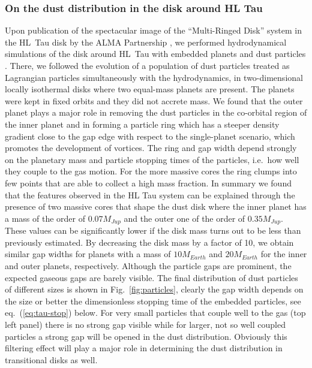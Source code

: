 \documentclass[10pt,fleqn,twoside]{article}
\begin{document}
\subsubsection{On the dust distribution in the disk around HL Tau}
%
Upon publication of the spectacular image of the ``Multi-Ringed Disk''
system in the HL~Tau disk by the ALMA Partnership
\citep{2015ApJ...808L...3A}, we
performed hydrodynamical simulations of the disk around HL~Tau with embedded planets and dust particles \citep{2015A&A...584A.110P}.
There, we followed the evolution of a population of dust particles treated as Lagrangian particles simultaneously with
the hydrodynamics, 
in two-dimensional locally isothermal disks where two equal-mass planets are present. 
The planets were kept in fixed orbits and they did not accrete mass. 
We found that the outer planet plays a major role in removing the dust particles in the co-orbital region of the 
inner planet and in forming a particle ring which has a steeper density gradient 
close to the gap edge with respect to the single-planet scenario, which promotes the development of vortices. 
The ring and gap width depend strongly on the planetary mass and particle stopping times of the particles,
i.e.\ how well they couple to the gas motion.
For the more massive cores the ring clumps into few points that are able to collect a high mass fraction.
In summary we found that the features observed in the HL Tau system can be explained
through the presence of two massive cores that shape the dust disk where the inner planet
has a mass of the order of $0.07 M_{Jup}$ and the outer one of the order of $0.35 M_{Jup}$. 
These values can be significantly lower if the disk mass turns out to be less than previously estimated. 
By decreasing the disk mass by a factor of 10, we obtain similar gap widths for planets with
a mass of $10 M_{Earth}$ and $20 M_{Earth}$ for the inner and outer planets, respectively. 
Although the particle gaps are prominent, the expected gaseous gaps are barely visible.
The final distribution of dust particles of different sizes is shown in Fig.~\ref{fig:particles},
clearly the gap width depends on the size or better the dimensionless stopping time of the embedded particles,
see eq.~(\ref{eq:tau-stop}) below.
For very small particles that couple well to the gas (top left panel) there is no strong gap visible
while for larger, not so well coupled particles a strong gap will be opened in the dust distribution.
Obviously this filtering effect will play a major role in determining the dust distribution in transitional disks as well.
\end{document}
